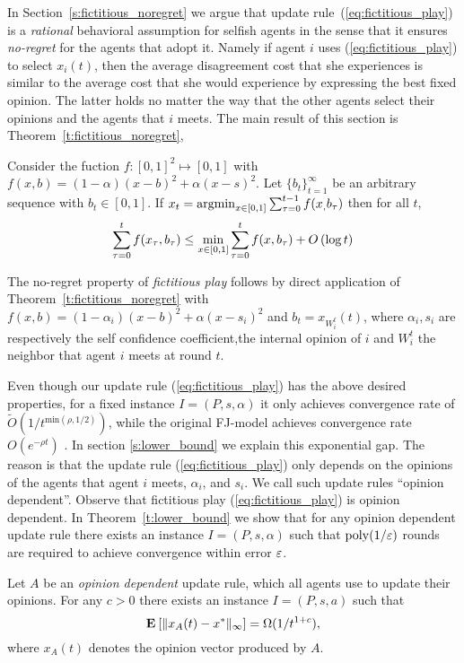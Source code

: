 In Section~\ref{s:fictitious_noregret} we argue that update rule~(\ref{eq:fictitious_play})
is a \emph{rational} behavioral assumption for selfish agents in the sense that 
it ensures \emph{no-regret} for the agents that adopt it. Namely if agent $i$ uses (\ref{eq:fictitious_play})
to select $x_i(t)$, then the average disagreement cost that she experiences is similar to the average cost that she would experience
by expressing the best fixed opinion. The latter holds no matter the way that the other agents select
their opinions and the agents that $i$ meets. The main result of this section is Theorem~\ref{t:fictitious_noregret},
\begin{theorem}\label{t:fictitious_noregret}
Consider the fuction $f:[0,1]^2 \mapsto [0,1]$ with $f(x,b) = (1-\alpha)(x-b)^2 + \alpha(x-s)^2$.
Let $\{b_t\}_{t=1}^\infty$ be an arbitrary sequence with $b_t \in [0,1]$. If $x_t = \operatorname*{argmin}_{x \in [0,1]}\sum_{\tau=0}^{t-1}f(x_,b_\tau)$
then for all $t$, 
\[\sum_{\tau=0}^{t}f(x_\tau,b_\tau) \leq \min_{x \in [0,1]}\sum_{\tau=0}^tf(x,b_\tau) + O\left(\log t\right)\]
\end{theorem}
The no-regret property of \emph{fictitious play} follows by direct application of Theorem~\ref{t:fictitious_noregret} 
with $f(x,b) = (1-\alpha_i)(x-b)^2 + \alpha(x-s_i)^2$ and $b_t = x_{W_i^t}(t)$, where $\alpha_i,s_i$ are 
respectively the self confidence coefficient,the internal opinion of $i$ and $W_i^t$ the neighbor 
that agent $i$ meets at round $t$.

Even though our update rule (\ref{eq:fictitious_play}) has the above
desired properties, for a fixed instance $I=(P,s,\alpha)$ it only achieves convergence rate of
$\widetilde{O}(1/t^{\text{min}(\rho,1/2)})$, while the original FJ-model
achieves convergence rate $O(e^{-\rho t})$ \cite{GS14}.
In section \ref{s:lower_bound} we explain this exponential gap.
The reason is that the update rule (\ref{eq:fictitious_play})
only depends on the opinions of the agents that agent $i$ meets,
$\alpha_i$, and $s_i$. We call such update rules \enquote{opinion dependent}.
Observe that fictitious play (\ref{eq:fictitious_play}) is opinion dependent.
  In Theorem~\ref{t:lower_bound} we
show that for any opinion dependent update rule there exists an instance
$I = (P,s,\alpha)$ such that $\mathrm{poly}(1/\varepsilon)$ rounds are required to
achieve convergence within error $\varepsilon$.
\begin{theorem}\label{t:lower_bound}
  Let $A$ be an \emph{opinion dependent} update rule, which all
  agents use to update their opinions.
  For any $c>0$ there exists an instance $I=(P,s,a)$ such that
  \[
    \Exp{\norm{\infty}{x_A(t) - x^*}} = \Omega(1/t^{1+c}),
  \]
where $x_A(t)$ denotes the opinion vector produced by $A$.
\end{theorem}

